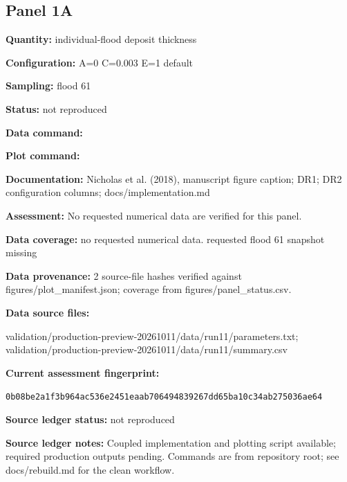 \subsection*{Panel 1A}
\textbf{Quantity:} individual-flood deposit thickness

\textbf{Configuration:} A=0 C=0.003 E=1 default

\textbf{Sampling:} flood 61

\textbf{Status:} not reproduced

\textbf{Data command:}\par {\small \texttt{}}\par

\textbf{Plot command:}\par {\small \texttt{}}\par

\textbf{Documentation:} Nicholas et al. (2018), manuscript figure caption; DR1; DR2 configuration columns; docs/\allowbreak{}implementation.md

\textbf{Assessment:} No requested numerical data are verified for this panel.

\textbf{Data coverage:} no requested numerical data. requested flood 61 snapshot missing

\textbf{Data provenance:} 2 source-file hashes verified against figures/\allowbreak{}plot\_\allowbreak{}manifest.json; coverage from figures/\allowbreak{}panel\_\allowbreak{}status.csv.

\textbf{Data source files:}\par {\small\raggedright validation/\allowbreak{}production-preview-20261011/\allowbreak{}data/\allowbreak{}run11/\allowbreak{}parameters.txt; validation/\allowbreak{}production-preview-20261011/\allowbreak{}data/\allowbreak{}run11/\allowbreak{}summary.csv\par}

\textbf{Current assessment fingerprint:}\par {\small\texttt{0b08be2a1f3b964ac536e2451eaab706494839267dd65ba10c34ab275036ae64}}\par

\textbf{Source ledger status:} not reproduced

\textbf{Source ledger notes:} Coupled implementation and plotting script available; required production outputs pending. Commands are from repository root; see docs/\allowbreak{}rebuild.md for the clean workflow.

